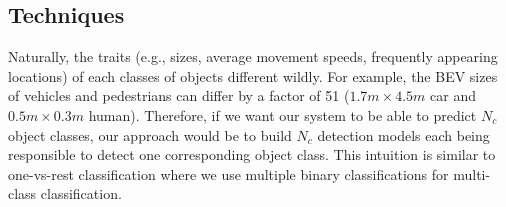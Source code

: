 \documentclass[letter]{article}
\begin{document}
	\subsection{Techniques}

    Naturally, the traits (e.g., sizes, average movement speeds, frequently appearing locations) of each classes of objects different wildly. For example, the BEV sizes of vehicles and pedestrians can differ by a factor of 51 ($ 1.7m \times 4.5m $ car and $ 0.5m \times 0.3m $ human). Therefore, if we want our system to be able to predict $ N_c $ object classes, our approach would be to build $ N_c $ detection models each being responsible to detect one corresponding object class. This intuition is similar to one-vs-rest classification where we use multiple binary classifications for multi-class classification. 
\end{document}
